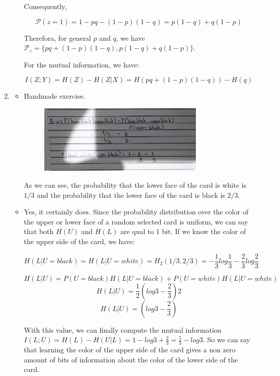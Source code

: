 \documentclass{article}
\begin{document}
\begin{enumerate}
\begin{enumerate}
		            Consequently,

		            \[\mathcal{P}(z=1) = 1 - pq - (1 - p)(1 - q) = p(1 - q) + q(1 - p)\]

		            Therefora, for general \(p\) and \(q\), we have \(\mathcal{P}_z = \{pq + (1 - p)(1 - q), p(1 - q) + q(1 - p)\}\).

		            For the mutual information, we have:

		            \[I(Z; Y) = H(Z) - H(Z | X) = H(pq + (1-p)(1-q)) - H(q)\]
	      \end{enumerate}
	\item
	      \begin{itemize}
		      \item Handmade exercise.
		            \begin{figure}[H]
			            \centering
			            \includegraphics[width=0.8\textwidth]{images/8.jpg}
		            \end{figure}
		            As we can see, the probability that the lower face of the card is white is \(1/3\) and the probability that the lower face of the card is black is \(2/3\).
		      \item Yes, it certainly does. Since the probability distribution over the color of the upper or lower face of a random selected card is uniform, we can say that both \(H(U)\) and \(H(L)\) are qual to 1 bit. If we know the color of the upper side of the card, we have:

		            \[H(L | U = black) = H(L | U = white) = H_2(1/3, 2/3) = -\frac{1}{3} log \frac{1}{3} - \frac{2}{3} log \frac{2}{3}\]

		            \[H(L | U) = P(U = black) H(L | U = black) + P(U = white) H(L | U = white)\]
		            \[H(L | U) = \frac{1}{2} (log 3 - \frac{2}{3}) 2\]
		            \[H(L | U) = (log 3 - \frac{2}{3})\]

		            With this value, we can finally compute the mutual information \(I(L;U) = H(L) - H(U | L) = 1 - log 3 + \frac{2}{3} = \frac{5}{3} - log3\). So we can say that learning the color of the upper side of the card gives a non zero amount of bits of information about the color of the lower side of the card.
	      \end{itemize}
\end{enumerate}


\end{document}
